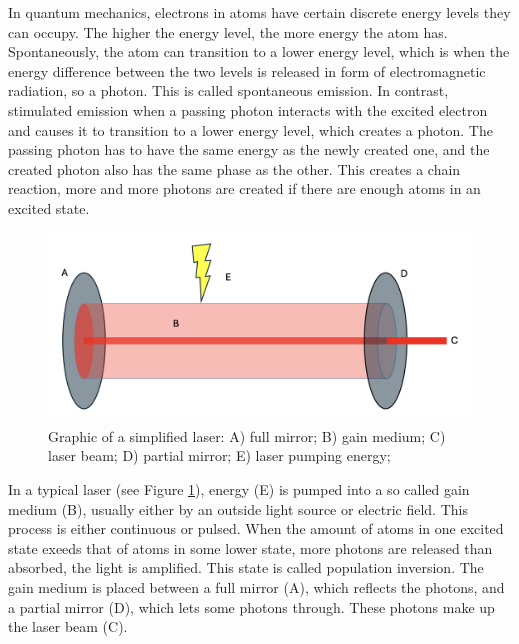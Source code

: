 \bigskip

In quantum mechanics, electrons in atoms have certain discrete energy levels they can occupy. The higher the energy level, the more energy the atom has. Spontaneously, the atom can transition to a lower energy level, which is when the energy difference between the two levels is released in form of electromagnetic radiation, so a photon. This is called spontaneous emission. In contrast, stimulated emission when a passing photon interacts with the excited electron and causes it to transition to a lower energy level, which creates a photon. The passing photon has to have the same energy as the newly created one, and the created photon also has the same phase as the other. This creates a chain reaction, more and more photons are created if there are enough atoms in an excited state.\cite{wikilaser} \cite{wikistimlaser}

\begin{figure}[ht]
    \centering
    \vspace{-10pt}
    \includegraphics[width=\textwidth]{images/setup_graphics/laser.png}
    \caption{Graphic of a simplified laser: A) full mirror; B) gain medium; C) laser beam; D) partial mirror; E) laser pumping energy;}
    \label{fig:laser}
\end{figure}


In a typical laser (see Figure \ref{fig:laser}), energy (E) is pumped into a so called gain medium (B), usually either by an outside light source or electric field. This process is either continuous or pulsed. When the amount of atoms in one excited state exeeds that of atoms in some lower state, more photons are released than absorbed, the light is amplified. This state is called population inversion. The gain medium is placed between a full mirror (A), which reflects the photons, and a partial mirror (D), which lets some photons through. These photons make up the laser beam (C).\cite{wikilaser} \cite{wikistimlaser}

